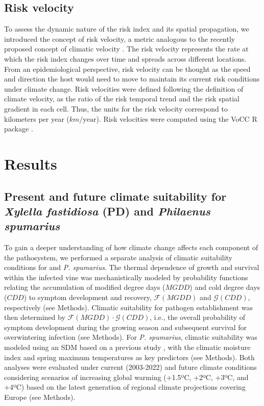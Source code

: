 \subsection{Risk velocity}

To assess the dynamic nature of the risk index and its spatial propagation,
we introduced the concept of risk velocity, a metric analogous to the recently
proposed concept of climatic velocity \cite{Loarie2009}. The risk velocity
represents the rate at which the risk index changes over time and spreads
across different locations. From an epidemiological perspective, risk velocity
can be thought as the speed and direction the host would need to move to
maintain its current risk conditions under climate change. Risk velocities were
defined following the definition of climate velocity, as the ratio of the risk
temporal trend and the risk spatial gradient in each cell. Thus, the units for
the risk velocity correspond to kilometers per year ($km/\mathrm{year}$). Risk
velocities were computed using the VoCC R package \cite{VoCC, VoCC_paper}.

\section{Results}

\subsection{Present and future climate suitability for \textit{Xylella
        fastidiosa} (PD) and \textit{Philaenus spumarius}}

To gain a deeper understanding of how climate change affects each component
of the pathosystem, we performed a separate analysis of climatic suitability
conditions for \xf{} and \textit{P. spumarius}. The thermal dependence of \xf{}
growth and survival within the infected vine was mechanistically modeled by
probability functions relating the accumulation of modified degree days
($MGDD$) and cold degree days ($CDD$) to symptom development and recovery,
$\mathcal{F}(MGDD)$ and $\mathcal{G}(CDD)$, respectively (see Methods).
Climatic suitability for pathogen establishment was then determined by
$\mathcal{F}(MGDD)\cdot\mathcal{G}(CDD)$, i.e., the overall probability of
symptom development during the growing season and subsequent survival for
overwintering infection (see Methods).	For \textit{P. spumarius}, climatic
suitability was modeled using an SDM based on a previous study
\cite{Godefroid2022_vector}, with the climatic moisture index
\cite{willmott_more_1992} and spring maximum temperatures  as key predictors
(see Methods). Both analyses were evaluated under current (2003-2022) and
future climate conditions considering scenarios of increasing global warming
(+1.5ºC, +2ºC, +3ºC, and +4ºC) based on the latest generation of regional
climate projections covering Europe \cite{jacob_regional_2020} (see Methods).

